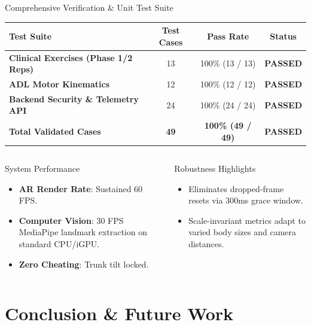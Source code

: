 \documentclass{beamer}
\begin{document}
\begin{frame}{Comprehensive Verification \& Unit Test Suite}
\begin{table}[]
\centering
\small
\begin{tabular}{lccc}
\toprule
\textbf{Test Suite} & \textbf{Test Cases} & \textbf{Pass Rate} & \textbf{Status} \\
\midrule
\textbf{Clinical Exercises (Phase 1/2 Reps)} & 13 & 100\% (13 / 13) & \textbf{PASSED} \\
\textbf{ADL Motor Kinematics} & 12 & 100\% (12 / 12) & \textbf{PASSED} \\
\textbf{Backend Security \& Telemetry API} & 24 & 100\% (24 / 24) & \textbf{PASSED} \\
\textbf{Total Validated Cases} & \textbf{49} & \textbf{100\% (49 / 49)} & \textbf{PASSED} \\
\bottomrule
\end{tabular}
\end{table}

\begin{columns}
\begin{block}{System Performance}
\begin{itemize}
    \item \textbf{AR Render Rate}: Sustained 60 FPS.
    \item \textbf{Computer Vision}: 30 FPS MediaPipe landmark extraction on standard CPU/iGPU.
    \item \textbf{Zero Cheating}: Trunk tilt locked.
\end{itemize}
\end{block}

\begin{exampleblock}{Robustness Highlights}
\begin{itemize}
    \item Eliminates dropped-frame resets via 300ms grace window.
    \item Scale-invariant metrics adapt to varied body sizes and camera distances.
\end{itemize}
\end{exampleblock}
\end{columns}
\end{frame}

\section{Conclusion \& Future Work}
\end{document}
